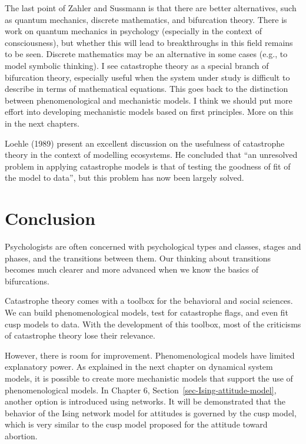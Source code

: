 \documentclass[
  a4paper,
  DIV=11,
  numbers=noendperiod,
  oneside]{scrreprt}
\begin{document}
The last point of Zahler and Sussmann is that there are better
alternatives, such as quantum mechanics, discrete mathematics, and
bifurcation theory. There is work on quantum mechanics in psychology
(especially in the context of consciousness), but whether this will lead
to breakthroughs in this field remains to be seen. Discrete mathematics
may be an alternative in some cases (e.g., to model symbolic thinking).
I see catastrophe theory as a special branch of bifurcation theory,
especially useful when the system under study is difficult to describe
in terms of mathematical equations. This goes back to the distinction
between phenomenological and mechanistic models. I think we should put
more effort into developing mechanistic models based on first
principles. More on this in the next chapters.

Loehle (1989) present an excellent discussion on the usefulness of
catastrophe theory in the context of modelling ecosystems. He concluded
that ``an unresolved problem in applying catastrophe models is that of
testing the goodness of fit of the model to data'', but this problem has
now been largely solved.

\hypertarget{sec-Conclusion}{%
\section{Conclusion}\label{sec-Conclusion}}

Psychologists are often concerned with psychological types and classes,
stages and phases, and the transitions between them. Our thinking about
transitions becomes much clearer and more advanced when we know the
basics of bifurcations.

Catastrophe theory comes with a toolbox for the behavioral and social
sciences. We can build phenomenological models, test for catastrophe
flags, and even fit cusp models to data. With the development of this
toolbox, most of the criticisms of catastrophe theory lose their
relevance.

However, there is room for improvement. Phenomenological models have
limited explanatory power. As explained in the next chapter on dynamical
system models, it is possible to create more mechanistic models that
support the use of phenomenological models. In Chapter 6,
Section~\ref{sec-Ising-attitude-model}, another option is introduced
using networks. It will be demonstrated that the behavior of the Ising
network model for attitudes is governed by the cusp model, which is very
similar to the cusp model proposed for the attitude toward abortion.
\end{document}
